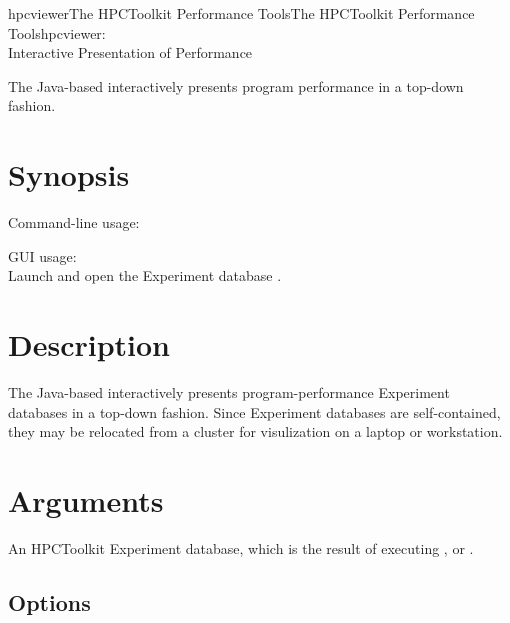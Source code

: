 \documentclass[english]{article}
\begin{document}
\begin{Name}{1}{hpcviewer}{The HPCToolkit Performance Tools}{The HPCToolkit Performance Tools}{hpcviewer:\\ Interactive Presentation of Performance}

The Java-based  interactively presents program performance in a top-down fashion.

\end{Name}

\section{Synopsis}

Command-line usage:\\
\SP\SP\SP{}  

GUI usage:\\
\SP\SP\SP Launch  and open the Experiment database .


\section{Description}

The Java-based  interactively presents program-performance Experiment databases in a top-down fashion.
Since Experiment databases are self-contained, they may be relocated from a cluster for visulization on a laptop or workstation.

\section{Arguments}

\begin{Description}
\item[\Arg{hpctoolkit-database}] An HPCToolkit Experiment database, which is the result of executing ,  or .
\end{Description}


\subsection{Options}
\end{document}
